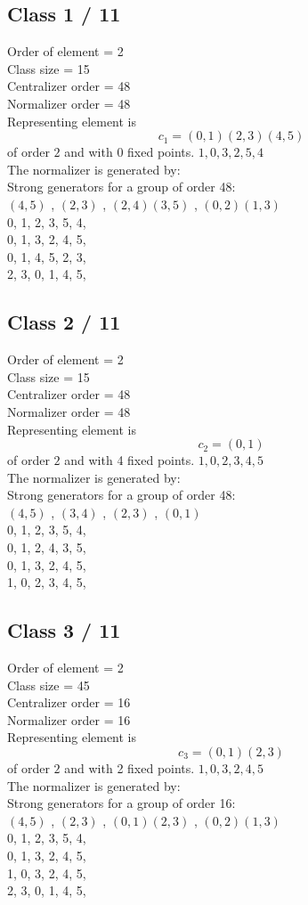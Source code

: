 \subsection*{Class 1 / 11}
Order of element = 2\\
Class size = 15\\
Centralizer order = 48\\
Normalizer order = 48\\
Representing element is
$$c_{1} = 
(0, 1)(2, 3)(4, 5)$$
of order $2$ and with 0 fixed points.
$1,0,3,2,5,4$\\
The normalizer is generated by:\\
Strong generators for a group of order 48:\\
$
(4, 5)$
, 
$
(2, 3)$
, 
$
(2, 4)(3, 5)$
, 
$
(0, 2)(1, 3)$
\\
0, 1, 2, 3, 5, 4, \\
0, 1, 3, 2, 4, 5, \\
0, 1, 4, 5, 2, 3, \\
2, 3, 0, 1, 4, 5, \\
\bigskip
\subsection*{Class 2 / 11}
Order of element = 2\\
Class size = 15\\
Centralizer order = 48\\
Normalizer order = 48\\
Representing element is
$$c_{2} = 
(0, 1)$$
of order $2$ and with 4 fixed points.
$1,0,2,3,4,5$\\
The normalizer is generated by:\\
Strong generators for a group of order 48:\\
$
(4, 5)$
, 
$
(3, 4)$
, 
$
(2, 3)$
, 
$
(0, 1)$
\\
0, 1, 2, 3, 5, 4, \\
0, 1, 2, 4, 3, 5, \\
0, 1, 3, 2, 4, 5, \\
1, 0, 2, 3, 4, 5, \\
\bigskip
\subsection*{Class 3 / 11}
Order of element = 2\\
Class size = 45\\
Centralizer order = 16\\
Normalizer order = 16\\
Representing element is
$$c_{3} = 
(0, 1)(2, 3)$$
of order $2$ and with 2 fixed points.
$1,0,3,2,4,5$\\
The normalizer is generated by:\\
Strong generators for a group of order 16:\\
$
(4, 5)$
, 
$
(2, 3)$
, 
$
(0, 1)(2, 3)$
, 
$
(0, 2)(1, 3)$
\\
0, 1, 2, 3, 5, 4, \\
0, 1, 3, 2, 4, 5, \\
1, 0, 3, 2, 4, 5, \\
2, 3, 0, 1, 4, 5, \\
\bigskip
